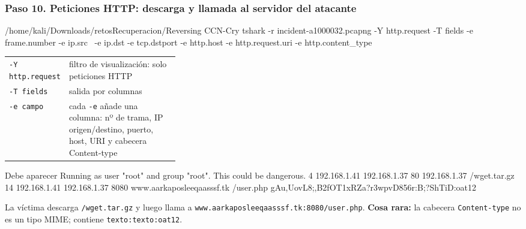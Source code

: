 \documentclass[11pt,a4paper]{article}
\begin{document}
\subsubsection*{Paso 10. Peticiones HTTP: descarga y llamada al servidor del atacante}
\begin{comando}{/home/kali/Downloads/retosRecuperacion/Reversing CCN-Cry}
tshark -r incident-a1000032.pcapng -Y http.request -T fields -e frame.number -e ip.src \
  -e ip.dst -e tcp.dstport -e http.host -e http.request.uri -e http.content_type
\end{comando}
\begin{tcolorbox}[enhanced, breakable, colback=gray!3, colframe=gray!35, boxrule=0.3pt, arc=1pt, left=4pt, right=4pt, top=2pt, bottom=2pt, fonttitle=\sffamily\scriptsize\bfseries, coltitle=black!70, colbacktitle=gray!10, title={Qué hace cada parte}, attach title to upper, before skip=2pt, after skip=4pt, fontupper=\small]
\par{\renewcommand{\arraystretch}{1.12}\begin{tabularx}{\linewidth}{@{}>{\raggedright\arraybackslash}p{0.33\linewidth}>{\raggedright\arraybackslash}X@{}}
\texttt{-Y http.request} & filtro de visualización: solo peticiones HTTP \\
\texttt{-T fields} & salida por columnas \\
\texttt{-e campo} & cada \texttt{-e} añade una columna: nº de trama, IP origen/destino, puerto, host, URI y cabecera Content-type \\
\end{tabularx}}
\end{tcolorbox}
\begin{salida}{Debe aparecer}
Running as user "root" and group "root". This could be dangerous.
4       192.168.1.41    192.168.1.37    80      192.168.1.37    /wget.tar.gz    
14      192.168.1.41    192.168.1.37    8080    www.aarkaposleeqaasssf.tk       /user.php       gAu,UovL8;,B2fOT1xRZa?r3wpvD856r:B;?ShTiD:oat12
\end{salida}
\begin{nota}La víctima descarga \texttt{/wget.tar.gz} y luego llama a \texttt{www.aarkaposleeqaasssf.tk:8080/user.php}. \textbf{Cosa rara:} la cabecera \texttt{Content-type} no es un tipo MIME; contiene \texttt{texto:texto:oat12}.\end{nota}
\end{document}

